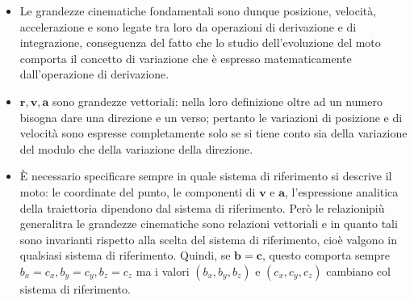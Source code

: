 \documentclass[class=book, crop=false, oneside, 12pt]{standalone}
\begin{document}
\begin{itemize}
  \item Le grandezze cinematiche fondamentali sono dunque posizione, velocità, accelerazione e sono legate tra loro da operazioni di derivazione e di integrazione, conseguenza del fatto che lo studio dell'evoluzione del moto comporta il concetto di variazione che è espresso matematicamente dall'operazione di derivazione. 
  \item \(\mathbf{r}, \boldsymbol{v}, \boldsymbol{a}\) sono grandezze vettoriali: nella loro definizione oltre ad un numero bisogna dare una direzione e un verso; pertanto le variazioni di posizione e di velocità sono espresse completamente solo se si tiene conto sia della variazione del modulo che della variazione della direzione. 
  \item È necessario specificare sempre in quale sistema di riferimento si descrive il moto: le coordinate del punto, le componenti di \(\boldsymbol{v}\) e \(\boldsymbol{a}\), l'espressione analitica della traiettoria dipendono dal sistema di riferimento. Però le relazionipiù generalitra le grandezze cinematiche sono relazioni vettoriali e in quanto tali sono invarianti rispetto alla scelta del sistema di riferimento, cioè valgono in qualsiasi sistema di riferimento. 
  Quindi, se \(\mathbf{b}=\mathbf{c}\), questo comporta sempre \(b_{x}=c_{x}, b_{y}=c_{y}, b_{z}=c_{z}\) ma i valori \(\left(b_{x}, b_{y}, b_{z}\right)\) e \(\left(c_{x}, c_{y}, c_{z}\right)\) cambiano col sistema di riferimento.
\end{itemize}
\end{document}
